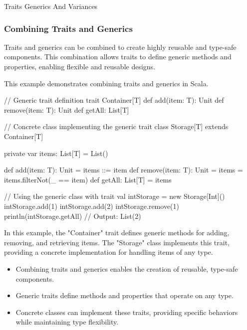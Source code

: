 \begin{notes}{Traits Generics And Variances}
    \subsubsection*{Combining Traits and Generics}
    
    Traits and generics can be combined to create highly reusable and type-safe components. This combination allows traits to define generic methods and properties, enabling flexible and reusable designs.
    
    \begin{highlight}
    
        This example demonstrates combining traits and generics in Scala.
    
    \begin{code}[Scala]
    // Generic trait definition
    trait Container[T] {
        def add(item: T): Unit
        def remove(item: T): Unit
        def getAll: List[T]
    }
    
    // Concrete class implementing the generic trait
    class Storage[T] extends Container[T] {
        private var items: List[T] = List()
    
        def add(item: T): Unit = items ::= item
        def remove(item: T): Unit = items = items.filterNot(_ == item)
        def getAll: List[T] = items
    }
    
    // Using the generic class with trait
    val intStorage = new Storage[Int]()
    intStorage.add(1)
    intStorage.add(2)
    intStorage.remove(1)
    println(intStorage.getAll)  // Output: List(2)
    \end{code}
    
        In this example, the "Container" trait defines generic methods for adding, removing, and retrieving items. The "Storage" class implements this trait, providing a concrete implementation for handling items of any type.
    
        \begin{itemize}
            \item Combining traits and generics enables the creation of reusable, type-safe components.
            \item Generic traits define methods and properties that operate on any type.
            \item Concrete classes can implement these traits, providing specific behaviors while maintaining type flexibility.
        \end{itemize}
    

\end{highlight}
\end{notes}
